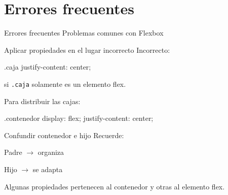 \documentclass[aspectratio=169,11.5pt]{beamer}
\begin{document}

    \section{Errores frecuentes}

    \SectionSlide
    {Errores frecuentes}
    {Problemas comunes con Flexbox}

    \begin{frame}[fragile]{Aplicar propiedades en el lugar incorrecto}
        Incorrecto:

        \begin{csscodedark}
            .caja {
                justify-content: center;
            }
        \end{csscodedark}

        si \texttt{.caja} solamente es un elemento flex.

        Para distribuir las cajas:

        \begin{csscodedark}
            .contenedor {
                display: flex;
                justify-content: center;
            }
        \end{csscodedark}
    \end{frame}

    \begin{frame}{Confundir contenedor e hijo}
        Recuerde:

        \begin{center}
            \Large
            Padre
            $\rightarrow$
            organiza

            \vspace{0.4cm}

            Hijo
            $\rightarrow$
            se adapta
        \end{center}

        Algunas propiedades pertenecen al contenedor
        y otras al elemento flex.
    \end{frame}
\end{document}
